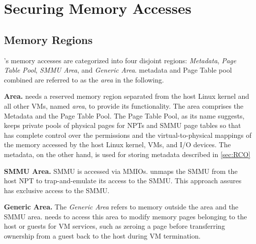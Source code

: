 \chapter{Securing \rustcore{} Memory Accesses}
\label{sec:securercore}

%

\section{\rustcore{} Memory Regions}
\label{sec:rcoreregions}

\rustcore{}'s memory accesses are categorized into four disjoint regions:
\textit{\rustcore{} Metadata}, \textit{Page Table Pool},
\textit{SMMU Area}, and \textit{Generic Area}.
\rustcore{} metadata and \rustcore{} Page Table pool combined are referred to as
the \textit{\rustcore{} area} in the following.

\textbf{\rustcore{} Area.}
\rustcore{} needs a reserved memory region separated from the host Linux kernel
and all other VMs, named \textit{\rustcore{} area}, to provide its functionality.
The \rustcore{} area comprises the \rustcore{} Metadata and the \rustcore{} Page Table Pool.
The \rustcore{} Page Table Pool, as its name suggests, keeps private pools of physical pages
for NPTs and SMMU page tables so that \rustcore{} has complete control
over the permissions and the virtual-to-physical mappings of the memory
accessed by the host Linux kernel, VMs, and I/O devices. The \rustcore{} metadata,
on the other hand, is used for storing \rustcore{} metadata described in
\autoref{sec:RCO}

\textbf{SMMU Area.}
SMMU is accessed via MMIOs. \rustcore{} unmaps the SMMU
from the host NPT to trap-and-emulate its access to the SMMU. This
approach assures \rustcore{} has exclusive access to the SMMU.

\textbf{Generic Area.}
The \textit{Generic Area} refers to memory outside the \rustcore{} area and the SMMU area.
\rustcore{} needs to access this area to modify memory pages
belonging to the host or guests for VM services, such as zeroing a page
before transferring ownership from a guest back to the host during VM termination.


